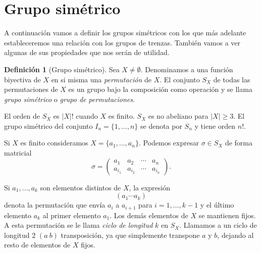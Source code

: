 \documentclass[12pt]{book}
\theoremstyle{definition}
\newtheorem{defi}{Definición}[section]
\begin{document}
\section{Grupo simétrico}

A continuación vamos a definir los grupos simétricos con los que más adelante estableceremos una relación con los grupos de trenzas. También vamos a ver algunas de sus propiedades que nos serán de utilidad.

\begin{defi}[Grupo simétrico]
Sea $X \neq \emptyset$. Denominamos a una función biyectiva de $X$ en si misma una \textit{permutación} de $X$. El conjunto $S_X$ de todas las permutaciones de $X$ es un grupo bajo la composición como operación y se llama \textit{grupo simétrico} o \textit{grupo de permutaciones}.
\end{defi}

El orden de $S_X$ es $|X|!$ cuando $X$ es finito. $S_X$ es no abeliano para $|X|\geq 3$. El grupo simétrico del conjunto $I_n=\{1,\ldots,n\}$ se denota por $S_n$ y tiene orden $n!$.

Si $X$ es finito consideramos $X = \{a_1,\ldots,a_n\}$. Podemos expresar $\sigma\in S_X$ de forma matricial
$$\sigma = 
\begin{pmatrix}
a_1 & a_2 & \cdots & a_n\\
a_{i_1} & a_{i_2} & \cdots & a_{i_n}
\end{pmatrix}
.$$

Si $a_1,\ldots,a_k$ son elementos distintos de $X$, la expresión
$$(a_1\cdots a_k)$$
denota la permutación que envía $a_i$ a $a_{i+1}$ para $i=1,\ldots,k-1$ y el último elemento $a_k$ al primer elemento $a_1$. Los demás elementos de $X$ se mantienen fijos. A esta permutación se le llama \textit{ciclo de longitud} $k$ en $S_X$. Llamamos a un ciclo de longitud $2$ $(a\ b)$ transposición, ya que simplemente transpone $a$ y $b$, dejando al resto de elementos de $X$ fijos.
\end{document}
